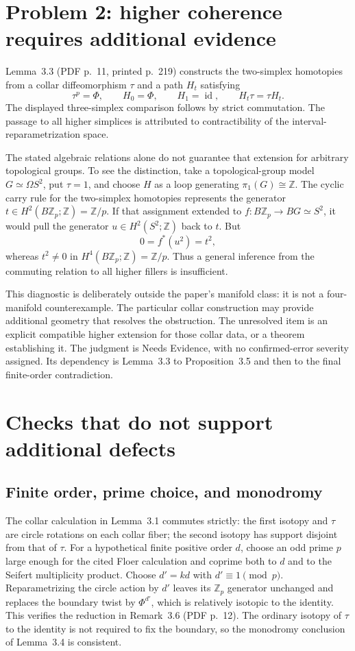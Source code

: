 \documentclass[10pt]{article}
\begin{document}
\section*{Problem 2: higher coherence requires additional evidence}
Lemma 3.3 (PDF p. 11, printed p. 219) constructs the two-simplex homotopies from a collar diffeomorphism \(\tau\) and a path \(H_t\) satisfying \[\tau^p=\Phi,\qquad H_0=\Phi,\qquad H_1=\operatorname{id},\qquad
 H_t\tau=\tau H_t.\] The displayed three-simplex comparison follows by strict commutation. The passage to all higher simplices is attributed to contractibility of the interval-reparametrization space.\par
The stated algebraic relations alone do not guarantee that extension for arbitrary topological groups. To see the distinction, take a topological-group model \(G\simeq\Omega S^2\), put \(\tau=1\), and choose \(H\) as a loop generating \(\pi_1(G)\cong\mathbb Z\). The cyclic carry rule for the two-simplex homotopies represents the generator \(t\in H^2(B\mathbb Z_p;\mathbb Z)=\mathbb Z/p\). If that assignment extended to \(f:B\mathbb Z_p\to BG\simeq S^2\), it would pull the generator \(u\in H^2(S^2;\mathbb Z)\) back to \(t\). But \[0=f^*(u^2)=t^2,\] whereas \(t^2\ne0\) in \(H^4(B\mathbb Z_p;\mathbb Z)=\mathbb Z/p\). Thus a general inference from the commuting relation to all higher fillers is insufficient.\par
This diagnostic is deliberately outside the paper’s manifold class: it is not a four-manifold counterexample. The particular collar construction may provide additional geometry that resolves the obstruction. The unresolved item is an explicit compatible higher extension for those collar data, or a theorem establishing it. The judgment is Needs Evidence, with no confirmed-error severity assigned. Its dependency is Lemma 3.3 to Proposition 3.5 and then to the final finite-order contradiction.\par
\section*{Checks that do not support additional defects}
\subsection*{Finite order, prime choice, and monodromy}
The collar calculation in Lemma 3.1 commutes strictly: the first isotopy and \(\tau\) are circle rotations on each collar fiber; the second isotopy has support disjoint from that of \(\tau\). For a hypothetical finite positive order \(d\), choose an odd prime \(p\) large enough for the cited Floer calculation and coprime both to \(d\) and to the Seifert multiplicity product. Choose \(d'=kd\) with \(d'\equiv1\pmod p\). Reparametrizing the circle action by \(d'\) leaves its \(\mathbb Z_p\) generator unchanged and replaces the boundary twist by \(\Phi^{d'}\), which is relatively isotopic to the identity. This verifies the reduction in Remark 3.6 (PDF p. 12). The ordinary isotopy of \(\tau\) to the identity is not required to fix the boundary, so the monodromy conclusion of Lemma 3.4 is consistent.\par
\end{document}
